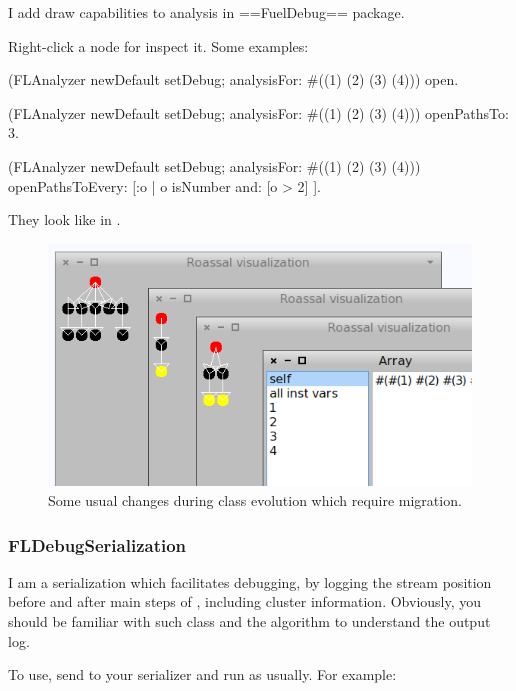 \documentclass[a4paper,10pt,twoside]{book}
\begin{document}
I add draw capabilities to analysis in ==FuelDebug== package.

Right-click a node for inspect it. Some examples:


\begin{code}{}
(FLAnalyzer newDefault
    setDebug;
    analysisFor: #((1) (2) (3) (4)))
    open.
\end{code}


\begin{code}{}
(FLAnalyzer newDefault
    setDebug;
    analysisFor: #((1) (2) (3) (4)))
    openPathsTo: 3.
\end{code}


\begin{code}{}
(FLAnalyzer newDefault
    setDebug;
    analysisFor: #((1) (2) (3) (4)))
    openPathsToEvery: [:o | o isNumber and: [o > 2] ].
\end{code}


They look like in .


\begin{figure}[t]\centering
        \includegraphics[width=0.8\linewidth]{FuelPreview.png}
        \caption{Some usual changes during class evolution which require migration.}
\end{figure}


\subsubsection{FLDebugSerialization}

I am a serialization which facilitates debugging, by logging the stream position before and after main steps of , including cluster information. Obviously, you should be familiar with such class and the algorithm to understand the output log.

To use, send  to your serializer and run as usually. For example:
\end{document}
